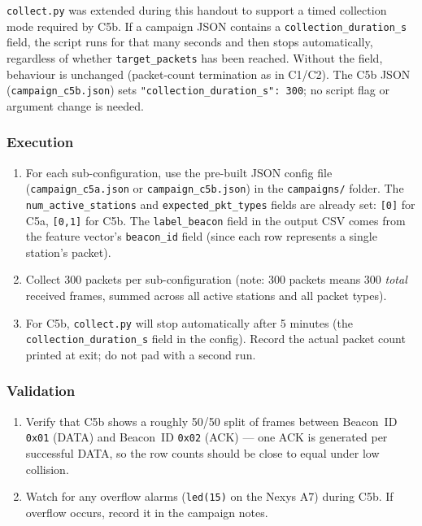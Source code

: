 \documentclass[11pt,letterpaper]{article}
\begin{document}
\begin{tcolorbox}[infobox={Collection script update: timed-run mode}]
\texttt{collect.py} was extended during this handout to support a timed collection mode required by C5b. If a campaign JSON contains a \texttt{collection\_duration\_s} field, the script runs for that many seconds and then stops automatically, regardless of whether \texttt{target\_packets} has been reached. Without the field, behaviour is unchanged (packet-count termination as in C1/C2). The C5b JSON (\texttt{campaign\_c5b.json}) sets \texttt{"collection\_duration\_s": 300}; no script flag or argument change is needed.
\end{tcolorbox}

\subsubsection{Execution}
\begin{enumerate}[leftmargin=2em]
	\item For each sub-configuration, use the pre-built JSON config file (\texttt{campaign\_c5a.json} or \texttt{campaign\_c5b.json}) in the \texttt{campaigns/} folder. The \texttt{num\_active\_stations} and \texttt{expected\_pkt\_types} fields are already set: \texttt{[0]} for C5a, \texttt{[0,1]} for C5b. The \texttt{label\_beacon} field in the output CSV comes from the feature vector's \texttt{beacon\_id} field (since each row represents a single station's packet).
	\item Collect 300 packets per sub-configuration (note: 300 packets means 300 \emph{total} received frames, summed across all active stations and all packet types).
	\item For C5b, \texttt{collect.py} will stop automatically after 5 minutes (the \texttt{collection\_duration\_s} field in the config). Record the actual packet count printed at exit; do not pad with a second run.
\end{enumerate}

\subsubsection{Validation}
\begin{enumerate}[leftmargin=2em]
	\item Verify that C5b shows a roughly 50/50 split of frames between Beacon~ID \texttt{0x01} (DATA) and Beacon~ID \texttt{0x02} (ACK) --- one ACK is generated per successful DATA, so the row counts should be close to equal under low collision.
	\item Watch for any \FIFO{} overflow alarms (\texttt{led(15)} on the Nexys A7) during C5b. If overflow occurs, record it in the campaign notes.
\end{enumerate}
\end{document}
